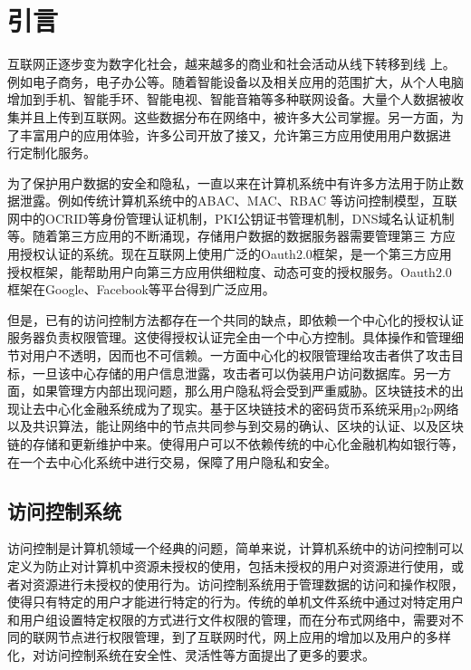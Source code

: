 
\chapter{引言}
\label{cha:intro}

互联网正逐步变为数字化社会，越来越多的商业和社会活动从线下转移到线 上。例如电子商务，电子办公等。随着智能设备以及相关应用的范围扩大，从个人电脑增加到手机、智能手环、智能电视、智能音箱等多种联网设备。大量个人数据被收 集并且上传到互联网。这些数据分布在网络中，被许多大公司掌握。另一方面，为 了丰富用户的应用体验，许多公司开放了接又，允许第三方应用使用用户数据进 行定制化服务。 

为了保护用户数据的安全和隐私，一直以来在计算机系统中有许多方法用于防止数据泄露。例如传统计算机系统中的ABAC、MAC、RBAC 等访问控制模型，互联网中的OCRID等身份管理认证机制，PKI公钥证书管理机制，DNS域名认证机制等。随着第三方应用的不断涌现，存储用户数据的数据服务器需要管理第三 方应用授权认证的系统。现在互联网上使用广泛的Oauth2.0框架，是一个第三方应用授权框架，能帮助用户向第三方应用供细粒度、动态可变的授权服务。Oauth2.0框架在Google、Facebook等平台得到广泛应用。

但是，已有的访问控制方法都存在一个共同的缺点，即依赖一个中心化的授权认证服务器负责权限管理。这使得授权认证完全由一个中心方控制。具体操作和管理细节对用户不透明，因而也不可信赖。一方面中心化的权限管理给攻击者供了攻击目标，一旦该中心存储的用户信息泄露，攻击者可以伪装用户访问数据库。另一方面，如果管理方内部出现问题，那么用户隐私将会受到严重威胁。区块链技术的出现让去中心化金融系统成为了现实。基于区块链技术的密码货币系统采用p2p网络以及共识算法，能让网络中的节点共同参与到交易的确认、区块的认证、以及区块链的存储和更新维护中来。使得用户可以不依赖传统的中心化金融机构如银行等，在一个去中心化系统中进行交易，保障了用户隐私和安全。 

\section{访问控制系统}

访问控制是计算机领域一个经典的问题，简单来说，计算机系统中的访问控制可以定义为防止对计算机中资源未授权的使用，包括未授权的用户对资源进行使用，或者对资源进行未授权的使用行为。访问控制系统用于管理数据的访问和操作权限，使得只有特定的用户才能进行特定的行为。传统的单机文件系统中通过对特定用户和用户组设置特定权限的方式进行文件权限的管理，而在分布式网络中，需要对不同的联网节点进行权限管理，到了互联网时代，网上应用的增加以及用户的多样化，对访问控制系统在安全性、灵活性等方面提出了更多的要求。

